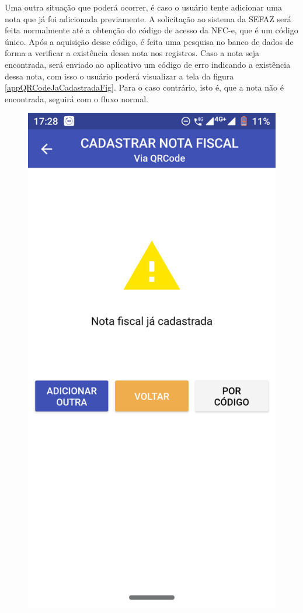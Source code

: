 \newpage
Uma outra situação que poderá ocorrer, é caso o usuário tente adicionar uma nota que já foi adicionada previamente. A solicitação ao sistema da SEFAZ será feita normalmente até a obtenção do código de acesso da NFC-e, que é um código único. Após a aquisição desse código, é feita uma pesquisa no banco de dados de forma a verificar a existência dessa nota nos registros. Caso a nota seja encontrada, será enviado ao aplicativo um código de erro indicando a existência dessa nota, com isso o usuário poderá visualizar a tela da figura \ref{appQRCodeJaCadastradaFig}. Para o caso contrário, isto é, que a nota não é encontrada, seguirá com o fluxo normal.

\begin{figure}[h]
    \centering
    \includegraphics[scale=0.15]{tcc/figures/app/app_codigo_qrcode_ja_cadastrada.png}

\end{figure}
